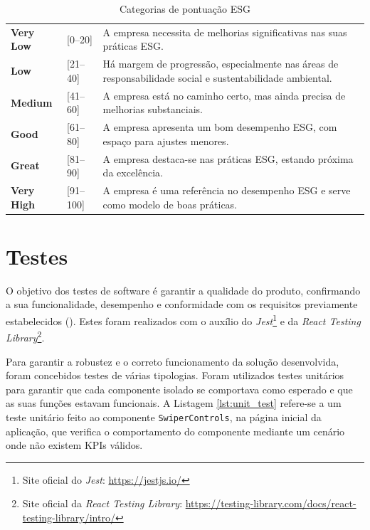 \begin{table}[H]
    \renewcommand{\arraystretch}{1.3}
    \setlength{\tabcolsep}{10pt}
    \centering
    \begin{tabular}{>{\bfseries}p{2.5cm} p{3cm} p{9cm}}
        \rowcolor{red!30} 
        Very Low & [0--20] & A empresa necessita de melhorias significativas nas suas práticas ESG. \\
        \rowcolor{orange!40} 
        Low & [21--40] & Há margem de progressão, especialmente nas áreas de responsabilidade social e sustentabilidade ambiental. \\
        \rowcolor{yellow!40} 
        Medium & [41--60] & A empresa está no caminho certo, mas ainda precisa de melhorias substanciais. \\
        \rowcolor{green!30} 
        Good & [61--80] & A empresa apresenta um bom desempenho ESG, com espaço para ajustes menores. \\
        \rowcolor{green!45!blue!25} 
        Great & [81--90] & A empresa destaca-se nas práticas ESG, estando próxima da excelência. \\
        \rowcolor{teal!40} 
        Very High & [91--100] & A empresa é uma referência no desempenho ESG e serve como modelo de boas práticas. \\
    \end{tabular}
    \caption{Categorias de pontuação ESG}
    \label{tab:esg_categories}
\end{table}


\section{Testes}

O objetivo dos testes de software é garantir a qualidade do produto, confirmando a sua funcionalidade, desempenho e conformidade com os requisitos previamente estabelecidos (\cite{softdesing2025}). Estes foram realizados com o auxílio do \textit{Jest}\footnote{Site oficial do \textit{Jest}: \url{https://jestjs.io/}} e da \textit{React Testing Library}\footnote{Site oficial da \textit{React Testing Library}: \url{https://testing-library.com/docs/react-testing-library/intro/}}.

Para garantir a robustez e o correto funcionamento da solução desenvolvida, foram concebidos testes de várias tipologias. Foram utilizados testes unitários para garantir que cada componente isolado se comportava como esperado e que as suas funções estavam funcionais. A Listagem \ref{lst:unit_test} refere-se a um teste unitário feito ao componente \texttt{SwiperControls}, na página inicial da aplicação, que verifica o comportamento do componente mediante um cenário onde não existem KPIs válidos.

